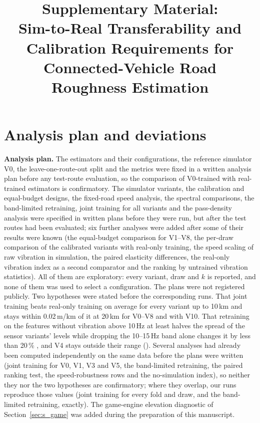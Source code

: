 \documentclass[onecolumn,10pt]{IEEEtran}
\begin{document}
\title{Supplementary Material:\\ Sim-to-Real Transferability and Calibration Requirements for Connected-Vehicle Road Roughness Estimation}
\maketitle

\section{Analysis plan and deviations}
\label{sec:s_protocol}
\textbf{Analysis plan.}
The estimators and their configurations, the reference simulator V0, the leave-one-route-out split and the metrics were fixed in a written analysis plan before any test-route evaluation, so the comparison of V0-trained with real-trained estimators is confirmatory.
The simulator variants, the calibration and equal-budget designs, the fixed-road speed analysis, the spectral comparisons, the band-limited retraining, joint training for all variants and the pass-density analysis were specified in written plans before they were run, but after the test routes had been evaluated; six further analyses were added after some of their results were known (the equal-budget comparison for V1--V8, the per-draw comparison of the calibrated variants with real-only training, the speed scaling of raw vibration in simulation, the paired elasticity differences, the real-only vibration index as a second comparator and the ranking by untrained vibration statistics).
All of them are exploratory: every variant, draw and $k$ is reported, and none of them was used to select a configuration.
The plans were not registered publicly.
Two hypotheses were stated before the corresponding runs.
That joint training beats real-only training on average for every variant up to 10\,km and stays within 0.02\,m/km of it at 20\,km \poHoneMeas{} for V0--V8 and \poHoneAll{} with V10.
That retraining on the features without vibration above 10\,Hz at least halves the spread of the sensor variants' levels while dropping the 10--15\,Hz band alone changes it by less than 20\,\% \blHthreeHolds, and V4 stays outside their range (\blHthreeBHolds).
Several analyses had already been computed independently on the same data before the plans were written (joint training for V0, V1, V3 and V5, the band-limited retraining, the paired ranking test, the speed-robustness rows and the no-simulation index), so neither they nor the two hypotheses are confirmatory; where they overlap, our runs reproduce those values (joint training for every fold and draw, and the band-limited retraining, exactly).
The game-engine elevation diagnostic of Section~\ref{sec:s_game} was added during the preparation of this manuscript.
\end{document}
